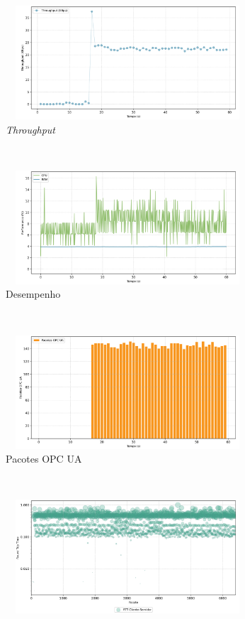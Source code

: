 \begin{apendicesenv}
\begin{figure}[htbp!]
    \centering
    \begin{subfigure}[t]{0.5\textwidth}
        \centering
        \includegraphics[width=1\textwidth, height=120pt]{USPSC-img/output/cropped/2-mitm_arp-tput.png}
        \caption{\textit{Throughput}}
    \end{subfigure}%
    ~ 
    \begin{subfigure}[t]{0.5\textwidth}
        \centering
        \includegraphics[width=1\textwidth, height=120pt]{USPSC-img/output/cropped/2-mitm_arp-perf.png}
        \caption{Desempenho}
    \end{subfigure}%
    \\
    \begin{subfigure}[t]{0.5\textwidth}
        \centering
        \includegraphics[width=1\textwidth, height=120pt]{USPSC-img/output/cropped/2-mitm_arp-pack.png}
        \caption{Pacotes OPC UA}
    \end{subfigure}%
    ~
    \begin{subfigure}[t]{0.5\textwidth}
        \centering
        \includegraphics[width=1\textwidth, height=120pt]{USPSC-img/output/cropped/2-mitm_arp-rttp.png}

\end{subfigure}
\end{figure}
\end{apendicesenv}
